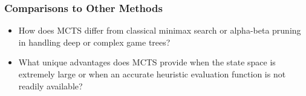 \subsubsection{Comparisons to Other Methods}
\begin{itemize}
    \item How does MCTS differ from classical minimax search or alpha-beta pruning in handling deep or complex game trees?  
    \item What unique advantages does MCTS provide when the state space is extremely large or when an accurate heuristic evaluation function is not readily available?
\end{itemize}